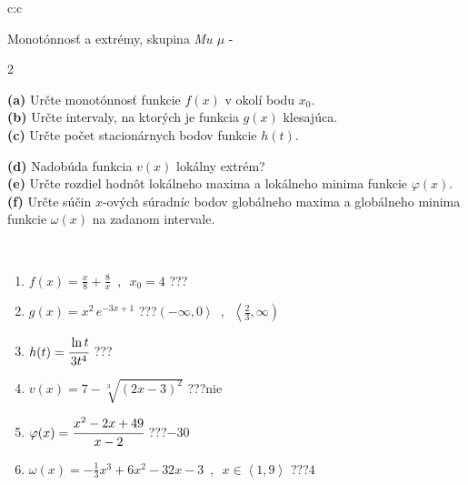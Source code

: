 \documentclass[10pt]{report}
\begin{document}
\newpage
\thispagestyle{empty}
\begin{tabular}{c:c}
\begin{minipage}[c][104.5mm][t]{0.5\linewidth}
\begin{center}
\vspace{7mm}
{\huge Monotónnosť a extrémy, skupina \textit{Mu $\mu$} -}\\[5mm]
\begin{minipage}{0.95\linewidth}
\begin{center}
{\small \begin{multicols}{2} \raggedright
\textbf{(a)} Určte monotónnosť funkcie \(f(x)\) v okolí bodu \(x_0\). \\[1mm]
\textbf{(b)} Určte intervaly, na ktorých je funkcia \(g(x)\) klesajúca. \\[1mm]
\textbf{(c)} Určte počet stacionárnych bodov funkcie \(h(t)\). \par \columnbreak
\textbf{(d)} Nadobúda funkcia \(v(x)\) lokálny extrém? \\[1mm]
\textbf{(e)} Určte rozdiel hodnôt lokálneho maxima a lokálneho minima funkcie \(\varphi(x)\). \\[1mm]
\textbf{(f)} Určte súčin \(x\)-ových súradníc bodov globálneho maxima a globálneho minima funkcie \(\omega(x)\) na zadanom intervale. \\[1mm]
\end{multicols}
}
\end{center}
\end{minipage}
\\[4mm]
\begin{minipage}{0.79\linewidth}
\begin{center}
\begin{varwidth}{\linewidth}
\begin{enumerate}
\normalsize
\item $f(x)=\frac{x}{8}+\frac{8}{x} \enspace , \enspace x_0=4$\quad \dotfill\; ???\;\dotfill \quad {}
\item $g(x)=x^2\, e^{-3x+1}$\quad \dotfill\; ???\;\dotfill \quad $\left(-\infty , 0\right\rangle\enspace , \enspace \left\langle\frac{2}{3} , \infty\right)$
\item $h(t)=\cfrac{\ln t}{3t^4}$\quad \dotfill\; ???\;\dotfill {}
\item $v(x)=7-\sqrt[3]{(2x-3)^2}$\quad \dotfill\; ???\;\dotfill \quad $\text{nie}$
\item $\varphi(x)=\cfrac{x^2-2x+49}{x-2}$\quad \dotfill\; ???\;\dotfill \quad $-30$
\item $\omega(x)=-\frac{1}{3}x^3+6x^2-32x-3 \enspace , \enspace x\in\left\langle1 , 9\right\rangle$\quad \dotfill\; ???\;\dotfill \quad $4$

\end{enumerate}
\end{varwidth}
\end{center}
\end{minipage}
\end{center}
\end{minipage}
\end{tabular}
\end{document}
